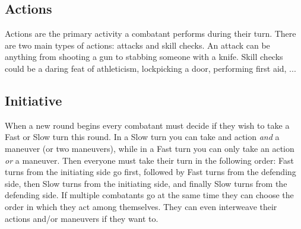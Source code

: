 \subsection{Actions}
Actions are the primary activity a combatant performs during their turn. 
There are two main types of actions: attacks and skill checks.
An attack can be anything from shooting a gun to stabbing someone with a knife.
Skill checks could be a daring feat of athleticism, lockpicking a door, performing first aid, ... 

\subsection{Initiative}
When a new round begins every combatant must decide if they wish to take a Fast or Slow turn this round.
In a Slow turn you can take and action \textit{and} a maneuver (or two maneuvers), 
while in a Fast turn you can only take an action \textit{or} a maneuver.  
Then everyone must take their turn in the following order:
Fast turns from the initiating side go first, followed by Fast turns from the defending side,
then Slow turns from the initiating side, and finally Slow turns from the defending side.
If multiple combatants go at the same time they can choose the order in which they act among themselves. 
They can even interweave their actions and/or maneuvers if they want to.



